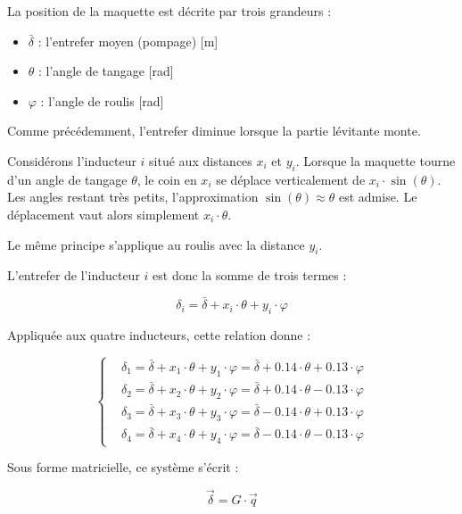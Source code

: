 La position de la maquette est décrite par trois grandeurs :

\begin{itemize}
    \item $\bar\delta$ : l'entrefer moyen (pompage) [m]
    \item $\theta$ : l'angle de tangage [rad]
    \item $\varphi$ : l'angle de roulis [rad]
\end{itemize}

Comme précédemment, l'entrefer diminue lorsque la partie lévitante monte.

Considérons l'inducteur $i$ situé aux distances $x_i$ et $y_i$. Lorsque la maquette tourne d'un angle de tangage $\theta$, le coin en $x_i$ se déplace verticalement de $x_i\cdot\sin(\theta)$. Les angles restant très petits, l'approximation $\sin(\theta)\approx\theta$ est admise. Le déplacement vaut alors simplement $x_i\cdot\theta$.

Le même principe s'applique au roulis avec la distance $y_i$.

L'entrefer de l'inducteur $i$ est donc la somme de trois termes :

\begin{equation}
    \delta_i = \bar\delta + x_i\cdot\theta + y_i\cdot\varphi
\end{equation}

Appliquée aux quatre inducteurs, cette relation donne :

\begin{equation*}
    \left\{ \begin{aligned}
         & \delta_1 = \bar\delta + x_1\cdot\theta + y_1\cdot\varphi = \bar\delta + 0.14\cdot\theta + 0.13\cdot\varphi \\
         & \delta_2 = \bar\delta + x_2\cdot\theta + y_2\cdot\varphi = \bar\delta + 0.14\cdot\theta - 0.13\cdot\varphi \\
         & \delta_3 = \bar\delta + x_3\cdot\theta + y_3\cdot\varphi = \bar\delta - 0.14\cdot\theta + 0.13\cdot\varphi \\
         & \delta_4 = \bar\delta + x_4\cdot\theta + y_4\cdot\varphi = \bar\delta - 0.14\cdot\theta - 0.13\cdot\varphi
    \end{aligned} \right.
\end{equation*}

Sous forme matricielle, ce système s'écrit :

\begin{equation}
    \vec{\delta} = G\cdot \vec{q}
\end{equation}

